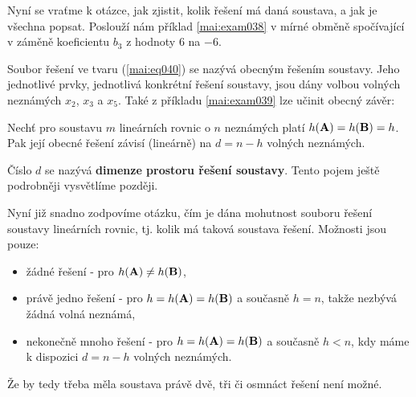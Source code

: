     Nyní se vraťme k otázce, jak zjistit, kolik řešení má daná soustava, a jak je všechna popsat.
    Poslouží nám příklad \ref{mai:exam038} v mírné obměně spočívající v záměně koeficientu \(b_3\) 
    z hodnoty \num{6} na \num{-6}.
    
    
    
    Soubor řešení ve tvaru (\ref{mai:eq040}) se nazývá obecným řešením soustavy. Jeho jednotlivé 
    prvky, jednotlivá konkrétní řešení soustavy, jsou dány volbou volných neznámých \(x_2\), 
    \(x_3\) a \(x_5\). Také z příkladu \ref{mai:exam039} lze učinit obecný závěr:
    
    \begin{lemma}\label{mai:lemma002}
      Nechť pro soustavu \(m\) lineárních rovnic o \(n\) neznámých platí \(h(\mathbf{A}) = 
      h(\mathbf{B}) = h\). Pak její obecné řešení závisí (lineárně) na \(d = n - h\) volných 
      neznámých.
    \end{lemma}
    
    Číslo \(d\) se nazývá \textbf{dimenze prostoru řešení soustavy}. Tento pojem ještě podrobněji 
    vysvětlíme později.
    
    Nyní již snadno zodpovíme otázku, čím je dána mohutnost souboru řešení soustavy lineárních 
    rovnic, tj. kolik má taková soustava řešení. Možnosti jsou pouze:
    \begin{itemize}
      \item žádné řešení - pro \(h(\mathbf{A}) \neq h(\mathbf{B})\),
      \item právě jedno řešení - pro \(h = h(\mathbf{A}) = h(\mathbf{B})\) a současně \(h = n\), takže 
            nezbývá žádná volná neznámá,
      \item nekonečně mnoho řešení - pro \(h = h(\mathbf{A}) = h(\mathbf{B})\) a současně \(h < n\),  
            kdy máme k dispozici \(d = n - h\) volných neznámých.
    \end{itemize}    
    Že by tedy třeba měla soustava právě dvě, tři či osmnáct řešení není možné.
    
